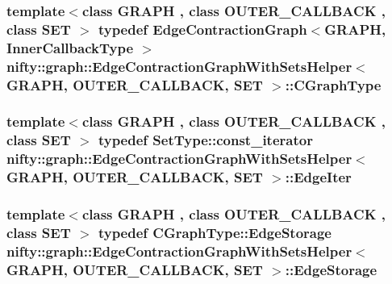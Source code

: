 \subsubsection[{C\+Graph\+Type}]{\setlength{\rightskip}{0pt plus 5cm}template$<$class G\+R\+A\+P\+H , class O\+U\+T\+E\+R\+\_\+\+C\+A\+L\+L\+B\+A\+C\+K , class S\+E\+T $>$ typedef {\bf Edge\+Contraction\+Graph}$<$G\+R\+A\+P\+H, {\bf Inner\+Callback\+Type} $>$ {\bf nifty\+::graph\+::\+Edge\+Contraction\+Graph\+With\+Sets\+Helper}$<$ G\+R\+A\+P\+H, O\+U\+T\+E\+R\+\_\+\+C\+A\+L\+L\+B\+A\+C\+K, S\+E\+T $>$\+::{\bf C\+Graph\+Type}}\label{structnifty_1_1graph_1_1EdgeContractionGraphWithSetsHelper_add695ccd6756ec7e79ce2b4e6fceb5fc}
\hypertarget{structnifty_1_1graph_1_1EdgeContractionGraphWithSetsHelper_ab619625636cb861e740f216ea946fe06}{}
\subsubsection[{Edge\+Iter}]{\setlength{\rightskip}{0pt plus 5cm}template$<$class G\+R\+A\+P\+H , class O\+U\+T\+E\+R\+\_\+\+C\+A\+L\+L\+B\+A\+C\+K , class S\+E\+T $>$ typedef Set\+Type\+::const\+\_\+iterator {\bf nifty\+::graph\+::\+Edge\+Contraction\+Graph\+With\+Sets\+Helper}$<$ G\+R\+A\+P\+H, O\+U\+T\+E\+R\+\_\+\+C\+A\+L\+L\+B\+A\+C\+K, S\+E\+T $>$\+::{\bf Edge\+Iter}}\label{structnifty_1_1graph_1_1EdgeContractionGraphWithSetsHelper_ab619625636cb861e740f216ea946fe06}
\hypertarget{structnifty_1_1graph_1_1EdgeContractionGraphWithSetsHelper_a2378dd6c8e82012a04236593971ac4e7}{}
\subsubsection[{Edge\+Storage}]{\setlength{\rightskip}{0pt plus 5cm}template$<$class G\+R\+A\+P\+H , class O\+U\+T\+E\+R\+\_\+\+C\+A\+L\+L\+B\+A\+C\+K , class S\+E\+T $>$ typedef {\bf C\+Graph\+Type\+::\+Edge\+Storage} {\bf nifty\+::graph\+::\+Edge\+Contraction\+Graph\+With\+Sets\+Helper}$<$ G\+R\+A\+P\+H, O\+U\+T\+E\+R\+\_\+\+C\+A\+L\+L\+B\+A\+C\+K, S\+E\+T $>$\+::{\bf Edge\+Storage}}\label{structnifty_1_1graph_1_1EdgeContractionGraphWithSetsHelper_a2378dd6c8e82012a04236593971ac4e7}
\hypertarget{structnifty_1_1graph_1_1EdgeContractionGraphWithSetsHelper_a7f5226bf25f277d906a526db55556cdf}{}
